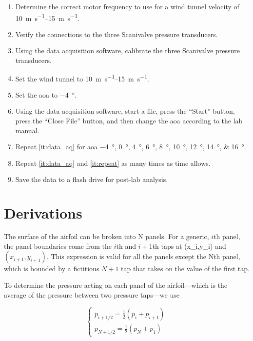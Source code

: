\begin{enumerate}
    \item Determine the correct motor frequency to use for a wind tunnel velocity of \qtyrange{10}{15}{\meter\per\second}.
    \item Verify the connections to the three Scanivalve pressure transducers.
    \item Using the data acquisition software, calibrate the three Scanivalve pressure transducers.
    \item Set the wind tunnel to \qtyrange{10}{15}{\meter\per\second}.
    \item Set the \acrshort{aoa} to \qty{-4}{\degree}.
    \item Using the data acquisition software, start a file, press the ``Start'' button, press the ``Close File'' button, and then change the \acrshort{aoa} according to the lab manual. \label{it:data_aq}
    \item Repeat \autoref{it:data_aq} for \acrshort{aoa} \qtylist{-4;0;4;6;8;10;12;14;16}{\degree}. \label{it:repeat}
    \item Repeat \autoref{it:data_aq} and \autoref{it:repeat} as many times as time allows.
    \item Save the data to a flash drive for post-lab analysis.
\end{enumerate}

\section{Derivations}\label{sec:derivations}

The surface of the airfoil can be broken into \gls{N} panels. For a generic, $i$th panel, the panel boundaries come from the $i$th and $i+1$th taps at (\gls{x_i},\gls{y_i}) and $(x_{i+1},y_{i+1})$. This expression is valid for all the panels except the \gls{N}th panel, which is bounded by a fictitious $N+1$ tap that takes on the value of the first tap.

To determine the pressure acting on each panel of the airfoil—which is the average of the pressure between two pressure taps—we use

\begin{equation}\label{eq:p_def}
    \begin{cases}
        p_{i+1/2}=\frac{1}{2}\left(p_i + p_{i + 1}\right) \\
        p_{N+1/2}=\frac{1}{2}\left(p_N + p_1\right)
    \end{cases}
\end{equation}


